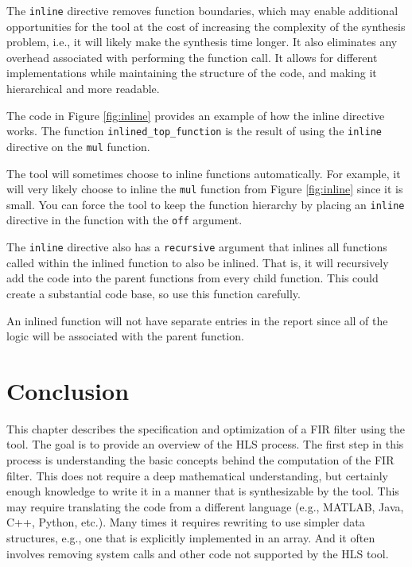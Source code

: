 \begin{aside}
The \lstinline{inline} directive removes function boundaries, which may enable additional opportunities for the \VHLS tool at the cost of increasing the complexity of the synthesis problem, i.e., it will likely make the synthesis time longer.  It also eliminates any overhead associated with performing the function call. It allows for different implementations while maintaining the structure of the code, and making it hierarchical and more readable.

The code in Figure \ref{fig:inline} provides an example of how the inline directive works. The function \lstinline{inlined_top_function} is the result of using the \lstinline{inline} directive on the \lstinline{mul} function.

The \VHLS tool will sometimes choose to inline functions automatically. For example, it will very likely choose to inline the \lstinline{mul} function from Figure \ref{fig:inline} since it is small. You can force the tool to keep the function hierarchy by placing an \lstinline{inline} directive in the function with the \lstinline{off} argument.

The \lstinline{inline} directive also has a \lstinline{recursive} argument that inlines all functions called within the inlined function to also be inlined. That is, it will recursively add the code into the parent functions from every child function. This could create a substantial code base, so use this function carefully.

An inlined function will not have separate entries in the report since all of the logic will be associated with the parent function.
\end{aside}


\section{Conclusion}
This chapter describes the specification and optimization of a FIR filter using the \VHLS tool. The goal is to provide an overview of the HLS process. The first step in this process is understanding the basic concepts behind the computation of the FIR filter. This does not require a deep mathematical understanding, but certainly enough knowledge to write it in a manner that is synthesizable by the \VHLS tool. This may require translating the code from a different language (e.g., MATLAB, Java, C++, Python, etc.). Many times it requires rewriting to use simpler data structures, e.g., one that is explicitly implemented in an array. And it often involves removing system calls and other code not supported by the HLS tool. 

